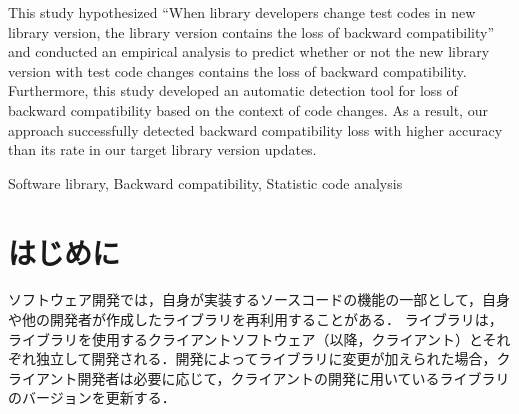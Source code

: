 \documentclass[submit]{ipsj}
\begin{document}
\begin{eabstract}
This study hypothesized ``When library developers change test codes in new library version, the library version contains the loss of backward compatibility'' and conducted an empirical analysis to predict whether or not the new library version with test code changes contains the loss of backward compatibility. Furthermore, this study developed an automatic detection tool for loss of backward compatibility based on the context of code changes. As a result, our approach successfully detected backward compatibility loss with higher accuracy than its rate in our target library version updates.
\end{eabstract}

\begin{ekeyword}
Software library, Backward compatibility, Statistic code analysis
\end{ekeyword}

\maketitle

\section{はじめに}

ソフトウェア開発では，自身が実装するソースコードの機能の一部として，自身や他の開発者が作成したライブラリを再利用することがある．
ライブラリは，ライブラリを使用するクライアントソフトウェア（以降，クライアント）とそれぞれ独立して開発される．開発によってライブラリに変更が加えられた場合，クライアント開発者は必要に応じて，クライアントの開発に用いているライブラリのバージョンを更新する．
\end{document}
